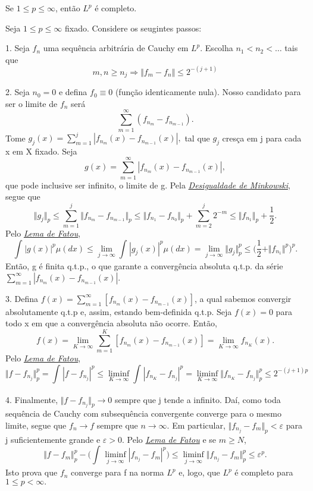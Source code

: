 \documentclass[MeasureTheory/measure_theory.tex]{subfiles}
\begin{document}
\begin{theorem*}
	Se \(1\leq p\leq \infty\), então \(L^{p}\) é completo.
\end{theorem*}
\begin{proof*}
	Seja \(1\leq p\leq \infty\) fixado. Considere os seugintes passos:

	1. Seja \(f_{n}\) uma sequência arbitrária de Cauchy em \(L^{p}.\) Escolha \(n_1 < n_2 <\dotsc \) tais que
	\[
		m, n\geq n_{j}\Rightarrow \Vert f_{m} - f_{n} \Vert \leq 2^{-(j+1)}
	\]

	2. Seja \(n_{0} = 0\) e defina \(f_{0}\equiv 0\) (função identicamente nula). Nosso candidato para ser o limite de \(f_{n}\) será
	\[
		\sum\limits_{m=1}^{\infty}(f_{n_{m}} - f_{n_{m-1}}).
	\]
	Tome \(g_{j}(x) = \sum\limits_{m=1}^{j}|f_{n_{m}}(x) - f_{n_{m-1}}(x)|,\) tal que \(g_{j}\) cresça em j para cada x em X fixado. Seja
	\[
		g(x) = \sum\limits_{m=1}^{\infty}|f_{n_{m}}(x) - f_{n_{m-1}}(x)|,
	\]
	que pode inclusive ser infinito, o limite de g. Pela \hyperlink{minkowski}{\textit{Desigualdade de Minkowski}}, segue que
	\[
		\Vert g_{j} \Vert_{p}\leq \sum\limits_{m=1}^{j}\Vert f_{n_{m}}-f_{n_{m-1}} \Vert_{p} \leq \Vert f_{n_{1}}-f_{n_{0}} \Vert_{p} + \sum\limits_{m=2}^{j}2^{-m}\leq \Vert f_{n_{1}} \Vert_{p}+\frac{1}{2}.
	\]
	Pelo \hyperlink{fatou}{\textit{Lema de Fatou}},
	\[
		\int_{}^{}|g(x)|^{p}\mu (dx)\leq \lim_{j\to \infty}\int_{}^{}|g_{j}(x)|^{p}\mu (dx) = \lim_{j\to \infty}\Vert g_{j} \Vert_{p}^{p}\leq \biggl(\frac{1}{2}+\Vert f_{n_1} \Vert^{p}\biggr)^{p}.
	\]
	Então, g é finita q.t.p., o que garante a convergência absoluta q.t.p. da série \(\sum\limits_{m=1}^{\infty}|f_{n_{m}}(x) - f_{n_{m-1}}(x)|.\)

	3. Defina \(f(x) = \sum\limits_{m=1}^{\infty}[f_{n_{m}}(x) - f_{n_{m-1}}(x)]\), a qual sabemos convergir absolutamente q.t.p e, assim, estando bem-definida q.t.p. Seja \(f(x) = 0\) para todo x em que a convergência absoluta não ocorre. Então,
	\[
		f(x) = \lim_{K\to \infty}\sum\limits_{m=1}^{K}[f_{n_{m}}(x) - f_{n_{m-1}}(x)] = \lim_{K\to \infty}f_{n_{K}}(x).
	\]
	Pelo \hyperlink{fatou}{\textit{Lema de Fatou}},
	\[
		\Vert f - f_{n_{j}} \Vert_{p}^{p} = \int_{}^{}|f-f_{n_{j}}|^{p}\leq \liminf_{K\to \infty}\int_{}^{}|f_{n_{K}}-f_{n_{j}}|^{p} = \liminf_{K\to \infty}\Vert f_{n_{K}}-f_{n_{j}} \Vert_{p}^{p} \leq 2^{-(j+1)p}
	\]

	4. Finalmente, \(\Vert f - f_{n_{j}} \Vert_{p}\to 0\) sempre que j tende a infinito. Daí, como toda sequência de Cauchy com subsequência convergente converge para o mesmo limite, segue que \(f_{n}\to f\) sempre que \(n\to \infty\).
	Em particular, \(\Vert f_{n_{j}} - f_{m}\Vert_{p}<\varepsilon \) para j suficientemente grande e \(\varepsilon  > 0\). Pelo \hyperlink{fatou}{\textit{Lema de Fatou}} e se \(m\geq N\),
	\[
		\Vert f-f_{m} \Vert_{p}^{p} - \biggl(\int_{}^{}\liminf_{j\to \infty}|f_{n_{j}}-f_{m}|^{p}\biggr) \leq \liminf_{j\to \infty}\Vert f_{n_{j}}-f_{m} \Vert_{p}^{p}\leq \varepsilon^{p}.
	\]
	Isto prova que \(f_{n}\) converge para f na norma \(L^{p}\) e, logo, que \(L^{p}\) é completo para \(1\leq p < \infty.\)



\end{proof*}
\end{document}
